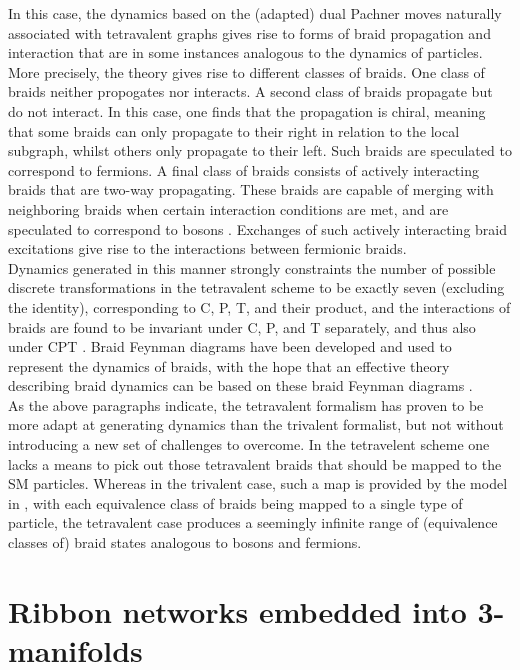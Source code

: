 \documentclass[aps,nofootinbib,amsfonts,superscriptaddress]{revtex4}
\begin{document}
In this case, the dynamics based on the (adapted) dual Pachner moves naturally associated with tetravalent graphs gives rise to forms of braid propagation and interaction that are in some instances analogous to the dynamics of particles. More precisely, the theory gives rise to different classes of braids. One class of braids neither propogates nor interacts. A second class of braids propagate but do not interact. In this case, one finds that the propagation is chiral, meaning that some braids can only propagate to their right in relation to the local subgraph, whilst others only propagate to their left. Such braids are speculated to correspond to fermions. A final class of braids consists of actively interacting braids that are two-way propagating. These braids are capable of merging with neighboring braids when certain interaction conditions are met, and are speculated to correspond to bosons \cite{SW}. Exchanges of such actively interacting braid excitations give rise to the interactions between fermionic braids.\\

Dynamics generated in this manner strongly constraints the number of possible discrete transformations in the tetravalent scheme to be exactly seven (excluding the identity), corresponding to C, P, T, and their product, and the interactions of braids are found to be invariant under C, P, and T separately, and thus also under CPT \cite{HW2}. Braid Feynman diagrams have been developed and used to represent the dynamics of braids, with the hope that an effective theory describing braid dynamics can be based on these braid Feynman diagrams \cite{YW2}.\\

As the above paragraphs indicate, the tetravalent formalism has proven to be more adapt at generating dynamics than the trivalent formalist, but not without introducing a new set of challenges to overcome. In the tetravelent scheme one lacks a means to pick out those tetravalent braids that should be mapped to the SM particles. Whereas in the trivalent case, such a map is provided by the model in \cite{BT}, with each equivalence class of braids being mapped to a single type of particle, the tetravalent case produces a seemingly infinite range of (equivalence classes of) braid states analogous to bosons and fermions.\\


\section{Ribbon networks embedded into 3-manifolds}
\end{document}
